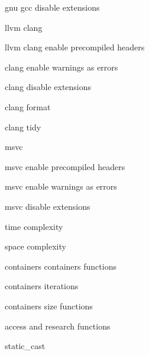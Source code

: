          gnu gcc disable extensions 
        
         llvm clang 
        
         llvm clang enable precompiled headers 
        
         clang enable warnings as errors
        
         clang disable extensions 
        
         clang format 
        
         clang tidy 
        
         msvc  
        
         msvc enable precompiled headers 
        
         msvc enable warnings as errors
        
         msvc disable extensions 

         time complexity
        
         space complexity
        
         containers
         containers functions
        
         containers iterations
        
         containers size functions 
        
         access and research functions 
        
         static_cast 
        
